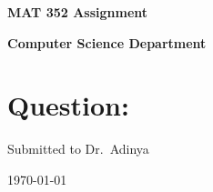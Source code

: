 \documentclass[a4paper]{article}
\begin{document}
    \begin{titlepage}

        \begin{center}
            \vspace*{1cm}

            \Huge
            \textbf{MAT 352 Assignment}

            \vspace{1.5cm}

            \textbf{Computer Science Department}

            \vspace{2cm}
            \Large
            \raggedright{
            \section*{Question:}
            \lipsum[1]}

            \vspace{5cm}
            \centering
            \large
            Submitted to Dr.\ Adinya

            \vspace{1cm}
            \today
            \normalsize
        \end{center}

    \end{titlepage}

	\pagestyle{fancy}
	\fancyhead{}
\end{document}
